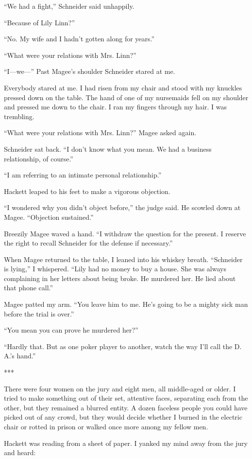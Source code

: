 {“We had a fight,” Schneider said unhappily.

“Because of Lily Linn?”

“No. My wife and I hadn’t gotten along for years.”

“What were your relations with Mrs. Linn?”

“I—we—” Past Magee’s shoulder Schneider stared at me.

Everybody stared at me. I had risen from my chair and stood with my knuckles pressed down on the table. The hand of one of my nursemaids fell on my shoulder and pressed me down to the chair. I ran my fingers through my hair. I was trembling.

“What were your relations with Mrs. Linn?” Magee asked again.

Schneider sat back. “I don’t know what you mean. We had a business relationship, of course.”

“I am referring to an intimate personal relationship.”

Hackett leaped to his feet to make a vigorous objection.

“I wondered why you didn’t object before,” the judge said. He scowled down at Magee. “Objection sustained.”

Breezily Magee waved a hand. “I withdraw the question for the present. I reserve the right to recall Schneider for the defense if necessary.”

When Magee returned to the table, I leaned into his whiskey breath. “Schneider is lying,” I whispered. “Lily had no money to buy a house. She was always complaining in her letters about being broke. He murdered her. He lied about that phone call.”

Magee patted my arm. “You leave him to me. He’s going to be a mighty sick man before the trial is over.”

“You mean you can prove he murdered her?”

“Hardly that. But as one poker player to another, watch the way I’ll call the D. A.’s hand.”

***

There were four women on the jury and eight men, all middle-aged or older. I tried to make something out of their set, attentive faces, separating each from the other, but they remained a blurred entity. A dozen faceless people you could have picked out of any crowd, but they would decide whether I burned in the electric chair or rotted in prison or walked once more among my fellow men.

Hackett was reading from a sheet of paper. I yanked my mind away from the jury and heard:

}
